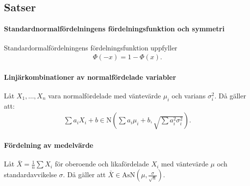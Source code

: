 \subsection{Satser}

\paragraph{Standardnormalfördelningens fördelningsfunktion och symmetri}
Standardormalfördelningens fördelningsfunktion uppfyller
\begin{align*}
	\Phi(-x) = 1 - \Phi(x).
\end{align*}

\paragraph{Linjärkombinationer av normalfördelade variabler}
Låt $X_1, \dots, X_n$ vara normalfördelade med väntevärde $\mu_i$ och varians $\sigma_i^2$. Då gäller att:
\begin{align*}
	\sum a_iX_i + b\in\text{N}\left(\sum a_i\mu_i + b, \sqrt{\sum a_i^2\sigma_i^2}\right).
\end{align*}

\paragraph{Fördelning av medelvärde}
Låt $\bar{X} = \frac{1}{n}\sum X_i$ för oberoende och likafördelade $X_i$ med väntevärde $\mu$ och standardavvikelse $\sigma$. Då gäller att $\bar{X}\in\text{AsN}\left(\mu, \frac{\sigma}{\sqrt{n}}\right)$.